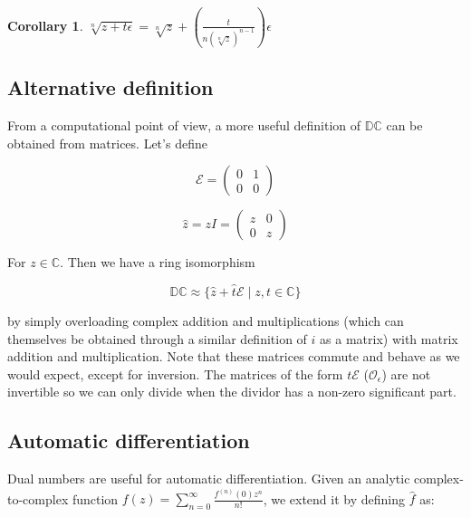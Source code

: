 \documentclass{article}
\newtheorem{corollary}[theorem]{Corollary}
\newcommand{\C}{\mathbb{C}}
\newcommand{\DC}{\mathbb{DC}}
\newcommand{\Z}{\mathcal{O}_\e}
\newcommand{\e}{\epsilon}
\newcommand{\E}{\mathcal{E}}
\begin{document}
\begin{corollary}
$\sqrt[n]{z + t \e} = \sqrt[n]{z} + (\frac{t}{n(\sqrt[n]{z})^{n-1}}) \e$
\end{corollary}

\subsection{Alternative definition}
From a computational point of view, a more useful definition of $\DC$ can be obtained from matrices. Let's define

\begin{multicols}{2}
\noindent
\begin{equation}
\E = \begin{pmatrix}
0 & 1\\
0 & 0
\end{pmatrix}
\end{equation}

\columnbreak

\noindent
\begin{equation}
\hat{z} = zI = \begin{pmatrix}
z & 0\\
0 & z
\end{pmatrix}
\end{equation}
\end{multicols}

For $z \in \C$. Then we have a ring isomorphism

\begin{equation}
\DC \approx \{\hat{z} + \hat{t} \E \; | \; z, t \in \C\}
\end{equation}

by simply overloading complex addition and multiplications (which can themselves be obtained through a similar definition of $i$ as a matrix) with matrix addition and multiplication. Note that these matrices commute and behave as we would expect, except for inversion. The matrices of the form $t\E$ ($\Z$) are not invertible so we can only divide when the dividor has a non-zero significant part.

\subsection{Automatic differentiation}

Dual numbers are useful for automatic differentiation. Given an analytic complex-to-complex function $f(z) = \sum_{n=0}^\infty \frac{f^{(n)}(0) z^n}{n!}$, we extend it by defining $\hat{f}$ as:
\end{document}
